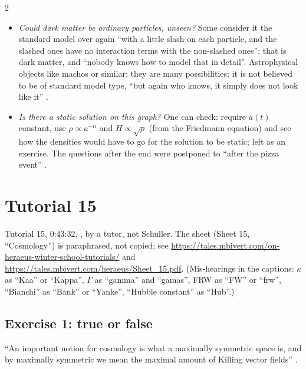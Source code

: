 \begin{paracol}{2}
\begin{coursenote}
\begin{itemize}
  \item \emph{Could dark matter be ordinary particles, unseen?} Some consider it the standard model over again ``with a little slash on each particle, and the slashed ones have no interaction terms with the non-slashed ones''; that is dark matter, and ``nobody knows how to model that in detail''. Astrophysical objects like machos or similar: they are many possibilities; it is not believed to be of standard model type, ``but again who knows, it simply does not look like it'' .
  \item \emph{Is there a static solution on this graph?} One can check: require $a(t)$ constant, use $\rho\propto a^{-n}$ and $H\propto\sqrt\rho$ (from the Friedmann equation) and see how the densities would have to go for the solution to be static; left as an exercise. The questions after the end were postponed to ``after the pizza event'' .
\end{itemize}
\end{coursenote}

\section{Tutorial 15}\label{sec:c21-t15}

Tutorial 15, 0:43:32, , by a tutor, not Schuller. The sheet (Sheet 15, ``Cosmology'') is paraphrased, not copied; see \url{https://tales.mbivert.com/on-heraeus-winter-school-tutorials/} and \url{https://tales.mbivert.com/heraeus/Sheet_15.pdf}. (Mis-hearings in the captions: $\kappa$ as ``Kaa'' or ``Kappa'', $\Gamma$ as ``gamma'' and ``gamas'', FRW as ``FW'' or ``frw'', ``Bianchi'' as ``Bank'' or ``Yanke'', ``Hubble constant'' as ``Hub''.)

\subsection*{Exercise 1: true or false}

``An important notion for cosmology is what a maximally symmetric space is, and by maximally symmetric we mean the maximal amount of Killing vector fields'' .


\end{paracol}
